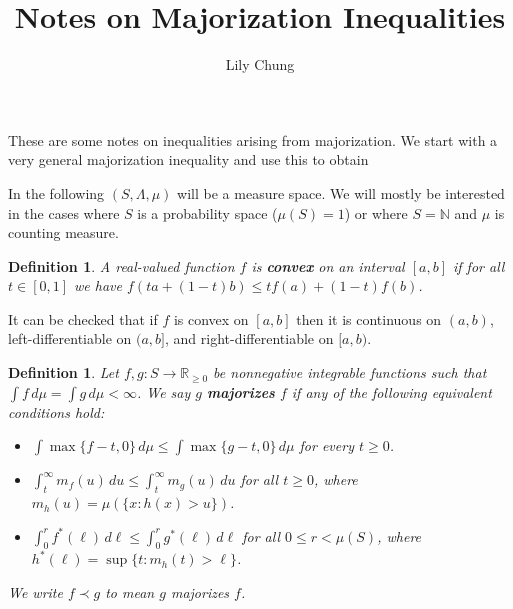\documentclass{article}
\title{Notes on Majorization Inequalities}
\author{Lily Chung}
\date{}
\newtheorem{definition}[theorem]{Definition}
\newcommand*{\defn}[1]{\textbf{#1}}
\newcommand*{\N}[0]{\mathbb{N}}
\newcommand*{\R}[0]{\mathbb{R}}
\def\[#1\]{\begin{align*}#1\end{align*}}
\begin{document}
\maketitle

These are some notes on inequalities arising from majorization.
We start with a very general majorization inequality and use this to obtain 

In the following $(S, \Lambda, \mu)$ will be a measure space.
We will mostly be interested in the cases where $S$ is a probability space ($\mu(S) = 1$) or where $S = \N$ and $\mu$ is counting measure.

\begin{definition}
  A real-valued function $f$ is \defn{convex} on an interval $[a, b]$ if for all $t \in [0, 1]$ we have $f(ta + (1 - t)b) \le tf(a) + (1 - t)f(b)$.
\end{definition}

It can be checked that if $f$ is convex on $[a, b]$ then it is continuous on $(a, b)$, left-differentiable on $(a, b]$, and right-differentiable on $[a, b)$.




\begin{definition}
  Let $f, g : S \to \R_{\ge 0}$ be nonnegative integrable functions such that $\int f\,d\mu = \int g\,d\mu < \infty$.
  We say $g$ \defn{majorizes} $f$ if any of the following equivalent conditions hold:
  \begin{itemize}
  \item $\int \max\{f - t, 0\}\,d\mu \le \int \max\{g - t, 0\}\,d\mu$ for every $t \ge 0$.
  \item $\int_t^\infty m_f(u)\,du \le \int_t^\infty m_g(u)\,du$ for all $t \ge 0$, where $m_h(u) = \mu(\{x : h(x) > u\})$.
  \item $\int_0^r f^*(\ell)\,d\ell \le \int_0^r g^*(\ell)\,d\ell$ for all $0 \le r < \mu(S)$, where $h^*(\ell) = \sup\{t : m_h(t) > \ell\}$.
  \end{itemize}
  We write $f \prec g$ to mean $g$ majorizes $f$.
\end{definition}
\end{document}
